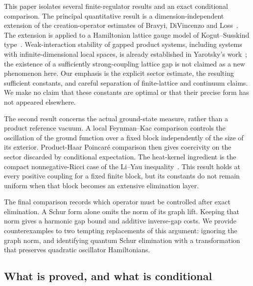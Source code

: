 \documentclass[11pt]{article}
\theoremstyle{definition}
\theoremstyle{remark}
\numberwithin{equation}{section}
\begin{document}
This paper isolates several finite-regulator results and an exact
conditional comparison. The principal quantitative result is a
dimension-independent extension of the creation-operator estimates of
Bravyi, DiVincenzo and Loss~\cite{BDL}. The extension is applied to a
Hamiltonian lattice gauge model of Kogut--Susskind type~\cite{KS}.
Weak-interaction stability of gapped product systems, including systems
with infinite-dimensional local spaces, is already established in
Yarotsky's work~\cite{Yarotsky}; the existence of a sufficiently
strong-coupling lattice gap is not claimed as a new phenomenon here.
Our emphasis is the explicit sector estimate, the resulting sufficient
constants, and careful separation of finite-lattice and continuum claims.
We make no claim that these constants are optimal or that their precise
form has not appeared elsewhere.

The second result concerns the actual ground-state measure, rather than
a product reference vacuum. A local Feynman--Kac comparison controls the
oscillation of the ground function over a fixed block independently of
the size of its exterior. Product-Haar Poincar\'e comparison then gives
coercivity on the sector discarded by conditional expectation. The
heat-kernel ingredient is the compact nonnegative-Ricci case of the
Li--Yau inequality~\cite{LiYau}. This result holds at every positive
coupling for a fixed finite block, but its constants do not remain
uniform when that block becomes an extensive elimination layer.

The final comparison records which operator must be controlled after
exact elimination. A Schur form alone omits the norm of its graph lift.
Keeping that norm gives a harmonic gap bound and additive inverse-gap
costs. We provide counterexamples to two tempting replacements of this
argument: ignoring the graph norm, and identifying quantum Schur
elimination with a transformation that preserves quadratic oscillator
Hamiltonians.

\subsection{What is proved, and what is conditional}
\end{document}
